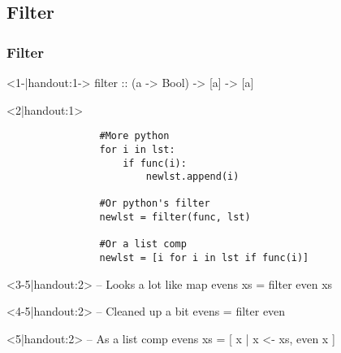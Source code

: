\subsection{Filter}
\begin{frame}[t,fragile]
    \frametitle{Filter}
    \begin{overprint}
        \begin{hscode}<1-|handout:1->
            filter :: (a -> Bool) -> [a] -> [a]
        \end{hscode}

        \begin{onlyenv}<2|handout:1>
            \begin{verbatim}
                #More python
                for i in lst:
                    if func(i):
                        newlst.append(i)

                #Or python's filter
                newlst = filter(func, lst)

                #Or a list comp
                newlst = [i for i in lst if func(i)]
            \end{verbatim}
        \end{onlyenv}

        \begin{hscode}<3-5|handout:2>
            -- Looks a lot like map
            evens xs = filter even xs
        \end{hscode}

        \begin{hscode}<4-5|handout:2>
            -- Cleaned up a bit
            evens = filter even
        \end{hscode}

        \begin{hscode}<5|handout:2>
            -- As a list comp
            evens xs = [ x | x <- xs, even x ]
        \end{hscode}

    \end{overprint}
\end{frame}

